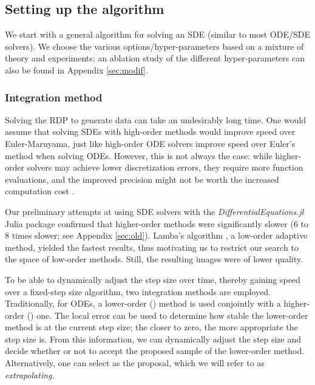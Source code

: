 \documentclass{article}
\begin{document}
\subsection{Setting up the algorithm}

We start with a general algorithm for solving an SDE (similar to most ODE/SDE solvers). We choose the various options/hyper-parameters based on a mixture of theory and experiments; an ablation study of the different hyper-parameters can also be found in Appendix \ref{sec:modif}.

\subsubsection{Integration method}\label{sec:int}

Solving the RDP to generate data can take an undesirably long time. One would assume that solving SDEs with high-order methods would improve speed over Euler-Maruyama, just like high-order ODE solvers improve speed over Euler's method when solving ODEs. However, this is not always the case: while higher-order solvers may achieve lower discretization errors, they require more function evaluations, 
and the improved precision might not be worth the increased computation cost
\citep{lehn2002adaptive, lamba2003adaptive}. 

Our preliminary attempts at using SDE solvers with the {\em DifferentialEquations.jl} Julia package \citep{DifferentialEquations.jl-2017} confirmed that higher-order methods were significantly slower (6 to 8 times slower; see Appendix \ref{sec:old}). Lamba's algorithm \citep{lamba2003adaptive}, a low-order adaptive method, yielded the fastest results, thus motivating us to restrict our search to the space of low-order methods. Still, the resulting images were of lower quality.

To be able to dynamically adjust the step size over time, thereby gaining speed over a fixed-step size algorithm, two integration methods are employed. Traditionally, for ODEs, a lower-order () method is used conjointly with a higher-order () one. The local error  
can be used to determine how stable the lower-order method is at the current step size; the closer to zero, the more appropriate the step size is. From this information, we can dynamically adjust the step size and decide whether or not to accept the proposed sample of the lower-order method. Alternatively, one can select  as the proposal, which we will refer to as \em extrapolating\em.
\end{document}
